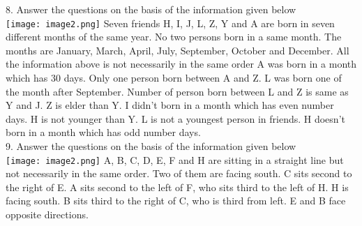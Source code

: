 \documentclass[
]{article}
\begin{document}
8. Answer the questions on the basis of the information given below\\
\texttt{[image: image2.png]}
Seven friends H, I, J, L, Z, Y and A are born in seven different months of the same year. No
two persons born in a same month. The months are January, March, April, July, September,
October and December. All the information above is not necessarily in the same order A
was born in a month which has 30 days. Only one person born between A and Z. L was
born one of the month after September. Number of person born between L and Z is same as
Y and J. Z is elder than Y. I didn't born in a month which has even number days. H is not
younger than Y. L is not a youngest person in friends. H doesn't born in a month which has
odd number days.\\

9. Answer the questions on the basis of the information given below\\
\texttt{[image: image2.png]}
A, B, C, D, E, F and H are sitting in a straight line but not necessarily in the same order. Two
of them are facing south. C sits second to the right of E. A sits second to the left of F, who
sits third to the left of H. H is facing south. B sits third to the right of C, who is third from
left. E and B face opposite directions.\\
\end{document}
